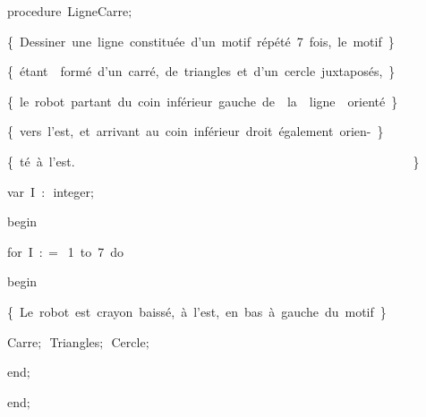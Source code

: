 {\pagebreak[3] 
\vspace{\neglskip}\mbox{\blc  \blk\idt  \mcl procedure\idt \ LigneCarre$;$}\par 
\vspace{\neglskip}\mbox{\blc  \blk\idt  \cmt  \{\ Dessiner\ une\ ligne\ constitu\'{e}e\ d{'}un\ motif\ r\'{e}p\'{e}t\'{e}\ 7\ fois,\ le\ motif\ \}\idt }\par 
\vspace{\neglskip}\mbox{\blc  \blk\idt  \cmt  \{\ \'{e}tant\ \ form\'{e}\ d{'}un\ carr\'{e},\ de\ triangles\ et\ d{'}un\ cercle\ juxtapos\'{e}s,\ \}\idt }\par 
\vspace{\neglskip}\mbox{\blc  \blk\idt  \cmt  \{\ le\ robot\ partant\ du\ coin\ inf\'{e}rieur\ gauche\ de\ \ la\ \ ligne\ \ orient\'{e}\ \}\idt }\par 
\vspace{\neglskip}\mbox{\blc  \blk\idt  \cmt  \{\ vers\ l{'}est,\ et\ arrivant\ au\ coin\ inf\'{e}rieur\ droit\ \'{e}galement\ orien-\ \}\idt }\par 
\vspace{\neglskip}\mbox{\blc  \blk\idt  \cmt  \{\ t\'{e}\ \`{a}\ l{'}est.\ \ \ \ \ \ \ \ \ \ \ \ \ \ \ \ \ \ \ \ \ \ \ \ \ \ \ \ \ \ \ \ \ \ \ \ \ \ \ \ \ \ \ \ \ \ \ \ \ \ \ \ \ \ \}\idt }\par 
\pagebreak[3] 
\vspace{\neglskip}\mbox{\blc  \blk\blk\idt  \mcl var\idt \ I\ $:$\ integer$;$}\par 
\vspace{\neglskip}\mbox{\blc  \blk\idt  \mcl begin\idt }\par 
\pagebreak[3] 
\vspace{\neglskip}\mbox{\blc  \blk\blk\idt  \mcl for\idt \ I\ $:$$=$\ 1\ \mcl to\idt \ 7\ \mcl do\idt }\par 
\vspace{\neglskip}\mbox{\blc  \blk\blk\blk\idt  \mcl begin\idt }\par 
\vspace{\neglskip}\mbox{\blc  \blk\blk\blk\blk\idt  \cmt  \{\ Le\ robot\ est\ crayon\ baiss\'{e},\ \`{a}\ l{'}est,\ en\ bas\ \`{a}\ gauche\ du\ motif\ \}\idt }\par 
\vspace{\neglskip}\mbox{\blc  \blk\blk\blk\blk\idt  Carre$;$\ Triangles$;$\ Cercle$;$\ }\par 
\vspace{\neglskip}\mbox{\blc  \blk\blk\blk\idt  \mcl end\idt $;$}\par 
\vspace{\neglskip}\mbox{\blc  \blk\idt  \mcl end\idt $;$}\par 
\medskip

}
